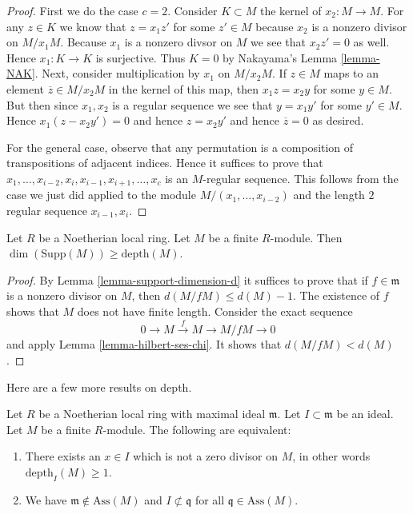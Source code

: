 \begin{proof}
First we do the case $c = 2$.
Consider $K \subset M$ the kernel of $x_2 : M \to M$.
For any $z \in K$ we know that $z = x_1 z'$
for some $z' \in M$ because
$x_2$ is a nonzero divisor on $M/x_1M$.
Because $x_1$ is a nonzero divsor on $M$ we see that $x_2 z' = 0$
as well. Hence $x_1 : K \to K$ is surjective.
Thus $K = 0$ by Nakayama's Lemma \ref{lemma-NAK}.
Next, consider multiplication by $x_1$ on $M/x_2M$.
If $z \in M$ maps to an element $\overline{z} \in M/x_2M$
in the kernel of this map, then $x_1 z = x_2 y$ for some $y \in M$.
But then since $x_1, x_2$ is a regular sequence we see that
$y = x_1 y'$ for some $y' \in M$. Hence $x_1 ( z - x_2 y' ) =0$
and hence $z = x_2 y'$ and hence $\overline{z} = 0$ as desired.

\medskip\noindent
For the general case, observe that any permutation is
a composition of transpositions of adjacent indices.
Hence it suffices to prove that
$x_1, \ldots, x_{i-2}, x_i, x_{i-1}, x_{i + 1}, \ldots, x_c$
is an $M$-regular sequence. This follows from the case we
just did applied to the module $M/(x_1, \ldots, x_{i-2})$
and the length $2$ regular sequence $x_{i-1}, x_i$.
\end{proof}

\begin{lemma}
\label{lemma-bound-depth}
Let $R$ be a Noetherian local ring.
Let $M$ be a finite $R$-module.
Then $\dim(\text{Supp}(M)) \geq \text{depth}(M)$.
\end{lemma}

\begin{proof}
By Lemma \ref{lemma-support-dimension-d} it suffices
to prove that if $f \in \mathfrak m$ is a nonzero
divisor on $M$, then $d(M/fM) \leq d(M) - 1$.
The existence of $f$ shows that $M$ does not have finite length.
Consider the exact sequence
$$
0 \to M \xrightarrow{f} M \to M/fM \to 0
$$
and apply Lemma \ref{lemma-hilbert-ses-chi}.
It shows that $d(M/fM) < d(M)$.
\end{proof}

\noindent
Here are a few more results on depth.

\begin{lemma}
\label{lemma-ideal-nonzerodivisor}
Let $R$ be a Noetherian local ring with
maximal ideal $\mathfrak m$. Let $I \subset \mathfrak m$
be an ideal. Let $M$ be a finite $R$-module.
The following are equivalent:
\begin{enumerate}
\item There exists an $x \in I$ which is not a zero
divisor on $M$, in other words $\text{depth}_I(M) \geq 1$.
\item We have $\mathfrak m \not\in \text{Ass}(M)$ and
$I \not \subset \mathfrak q$ for all $\mathfrak q \in \text{Ass}(M)$.
\end{enumerate}
\end{lemma}

